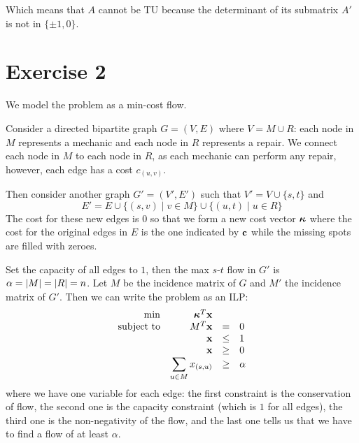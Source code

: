 \documentclass[12pt]{extarticle}
\renewcommand{\vec}[1]{\bvec{#1}}
\numberwithin{equation}{section}
\begin{document}
Which means that $A$ cannot be TU because the determinant of its submatrix $A'$ is not in
$\{\pm 1 , 0\}$.

\section*{Exercise 2}

We model the problem as a min-cost flow.

Consider a directed bipartite graph $G = (V, E)$ where $V = M \cup R$: each node in $M$ represents
a mechanic and each node in $R$ represents a repair. We connect each node in $M$ to each node in
$R$, as each mechanic can perform any repair, however, each edge has a cost $c_{(u, v)}$.

Then consider another graph $G' = (V', E')$ such that $V' = V \cup \{s, t\}$ and
\begin{equation}
	E' = E \cup \{ (s, v) \mid v \in M \} \cup \{ (u, t) \mid u \in R\}
\end{equation}
The cost for these new edges is $0$ so that we form a new cost vector $\vec \kappa$ where the cost
for the original edges in $E$ is the one indicated by $\vec c$ while the missing spots are filled
with zeroes.

Set the capacity of all edges to $1$, then the max $s$-$t$ flow in $G'$ is
$\alpha = \abs{M} = \abs{R} = n$.
Let $M$ be the incidence matrix of $G$ and $M'$ the incidence matrix of $G'$.
Then we can write the problem as an ILP:
\begin{equation}
	\begin{array}{rrcl}
		\min              & \vec \kappa^T \vec x                    &      &        \\
		\text{subject to} & M^T \vec x                              & =    & 0      \\
		                  & \vec x                                  & \leq & 1      \\
		                  & \vec x                                  & \geq & 0      \\
		                  & \displaystyle \sum_{u \in M} x_{(s, u)} & \geq & \alpha
	\end{array}
\end{equation}
where we have one variable for each edge: the first constraint is the conservation of flow, the
second one is the capacity constraint (which is $1$ for all edges), the third one is the
non-negativity of the flow, and the last one tells us that we have to find a flow of at least
$\alpha$.
\end{document}
